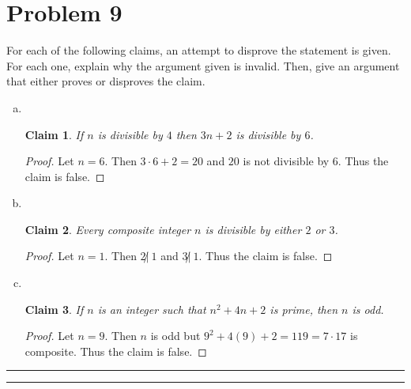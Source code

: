 \documentclass{article}
\newtheorem*{claim}{Claim} %
\theoremstyle{definition}
\newenvironment{solution}{\bigskip\hrule{\hfill}}{\bigskip\hrule{\hfill}} %
\begin{document}

\newpage


\section*{Problem 9}

For each of the following claims, an attempt to disprove the statement is given. For each one, explain why the argument given is invalid. Then, give an argument that either proves or disproves the claim.

\begin{enumerate}[a)] %
    \item ~\vspace{-19pt}
    \begin{claim}
        If $n$ is divisible by $4$ then $3n+2$ is divisible by $6$.
    \end{claim}
    \begin{proof}
        Let $n=6$. Then $3\cdot 6+2=20$ and $20$ is not divisible by $6$. Thus the claim is false.
    \end{proof}
    
    \item ~\vspace{-19pt}
    \begin{claim}
         Every composite integer $n$ is divisible by either $2$ or $3$.
    \end{claim}
    \begin{proof}
        Let $n=1$. Then $2\not|~ 1$ and $3\not|~1$. Thus the claim is false.
    \end{proof}

    \item ~\vspace{-19pt}
    \begin{claim}
        If $n$ is an integer such that $n^2+4n+2$ is prime, then $n$ is odd.
    \end{claim}
    \begin{proof}
        Let $n=9$. Then $n$ is odd but $9^2+4\left(9\right)+2=119=7\cdot17$ is composite. Thus the claim is false.
    \end{proof}
\end{enumerate}

\begin{solution}


\end{solution}

\end{document}
